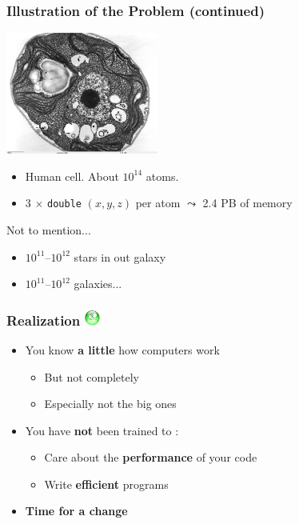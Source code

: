 \documentclass[xcolor={x11names,svgnames,psnames}]{beamer}
\newcommand{\triste}{\includegraphics[width=0.5cm,trim=0 17mm 0 0]{triste}}
\newcommand{\red}{\alert}
\begin{document}

\begin{frame}
\frametitle{Illustration of the Problem (continued)}

\begin{center}
\includegraphics[width=5cm]{cell.jpg}
\end{center}

\begin{itemize}
\item Human cell. About $10^{14}$ atoms.
\item 3 $\times$ \texttt{double} $(x, y, z)$ per atom $\leadsto$ 2.4 PB of memory
\end{itemize}

\medskip

\begin{alertblock}{Not to mention...}
  \begin{itemize}
  \item $10^{11}$--$10^{12}$ stars in out galaxy
  \item $10^{11}$--$10^{12}$ galaxies...
  \end{itemize}
\end{alertblock}

\end{frame}



\begin{frame}
  \frametitle{Realization \triste}

  \begin{itemize}
  \item You know \textbf{a little} how computers work
    \begin{itemize}
    \item But \red{not completely}
    \item Especially not the big ones
    \end{itemize}

    \medskip
    
  \item You have \textbf{not} been trained to :
    \begin{itemize}
    \item \red{Care} about the \textbf{performance} of your code
    \item Write \textbf{efficient} programs
    \end{itemize}
    
    \pause
    \bigskip

    \item \Huge \textbf{Time for a change}
    \end{itemize}

\end{frame}
\end{document}
